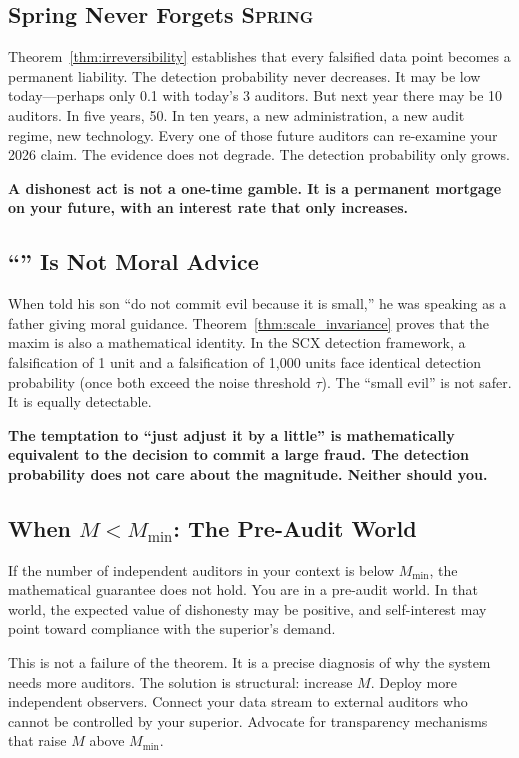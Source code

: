 \documentclass[11pt,a4paper]{article}
\theoremstyle{definition}
\theoremstyle{remark}
\newcommand{\SCX}{\textsc{SCX}}
\newcommand{\Spring}{\textsc{Spring}}
\newcommand{\threshold}{\tau}
\begin{document}
\subsection{Spring Never Forgets \Spring{}}

Theorem~\ref{thm:irreversibility} establishes that every falsified data point becomes a permanent liability. The detection probability never decreases. It may be low today---perhaps only 0.1 with today's 3 auditors. But next year there may be 10 auditors. In five years, 50. In ten years, a new administration, a new audit regime, new technology. Every one of those future auditors can re-examine your 2026 claim. The evidence does not degrade. The detection probability only grows.

\textbf{A dishonest act is not a one-time gamble. It is a permanent mortgage on your future, with an interest rate that only increases.}

\subsection{``'' Is Not Moral Advice }

When  told his son ``do not commit evil because it is small,'' he was speaking as a father giving moral guidance. Theorem~\ref{thm:scale_invariance} proves that the maxim is also a mathematical identity. In the \SCX{} detection framework, a falsification of 1 unit and a falsification of 1,000 units face identical detection probability (once both exceed the noise threshold $\threshold$). The ``small evil'' is not safer. It is equally detectable.

\textbf{The temptation to ``just adjust it by a little'' is mathematically equivalent to the decision to commit a large fraud. The detection probability does not care about the magnitude. Neither should you.}

\subsection{When $M < M_{\min}$: The Pre-Audit World }

If the number of independent auditors in your context is below $M_{\min}$, the mathematical guarantee does not hold. You are in a pre-audit world. In that world, the expected value of dishonesty may be positive, and self-interest may point toward compliance with the superior's demand.

This is not a failure of the theorem. It is a precise diagnosis of why the system needs more auditors. The solution is structural: increase $M$. Deploy more independent observers. Connect your data stream to external auditors who cannot be controlled by your superior. Advocate for transparency mechanisms that raise $M$ above $M_{\min}$.
\end{document}
